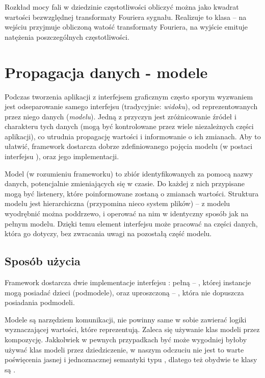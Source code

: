 Rozkład mocy fali w dziedzinie częstotliwości obliczyć można jako kwadrat wartości bezwzględnej
transformaty Fouriera sygnału. Realizuje to klasa  -- na wejściu przyjmuje
obliczoną watość transformaty Fouriera, na wyjście emituje natężenia poszczególnych częstotliwości.


\chapter{Propagacja danych - modele}

Podczas tworzenia aplikacji z interfejsem graficznym często sporym wyzwaniem jest odseparowanie
samego interfejsu (tradycyjnie: \emph{widoku}), od reprezentowanych przez niego danych
(\emph{modelu}). Jedną z przyczyn jest zróżnicowanie źródeł i charakteru tych danych (mogą być
kontrolowane przez wiele niezależnych części aplikacji), co utrudnia propagację wartości i
informowanie o ich zmianach. Aby to ułatwić, framework dostarcza dobrze zdefiniowanego pojęcia
modelu (w postaci interfejsu ), oraz jego implementacji.

Model (w rozumieniu frameworku) to zbiór identyfikowanych za pomocą nazwy danych, potencjalnie
zmieniających się w czasie. Do każdej z nich przypisane mogą być listenery, które poinformowane
zostaną o zmianach wartości. Struktura modelu jest hierarchiczna (przypomina nieco system plików) --
z modelu wyodrębnić można poddrzewo, i operować na nim w identyczny sposób jak na pełnym modelu.
Dzięki temu element interfejsu może pracować na części danych, która go dotyczy, bez zwracania uwagi
na pozostałą część modelu.

\section{Sposób użycia}

Framework dostarcza dwie implementacje interfejsu : pełną -- ,
której instancje mogą posiadać dzieci (podmodele), oraz uproszczoną -- , która nie
dopuszcza posiadania podmodeli.

Modele są narzędziem komunikacji, nie powinny same w sobie zawierać logiki wyznaczającej wartości,
które reprezentują. Zaleca się używanie klas modeli przez kompozycję. Jakkolwiek w pewnych
przypadkach być może wygodniej byłoby używać klas modeli przez dziedziczenie, w naszym odczuciu nie
jest to warte poświęcenia jasnej i jednoznacznej semantyki typu , dlatego też obydwie te
klasy są .

